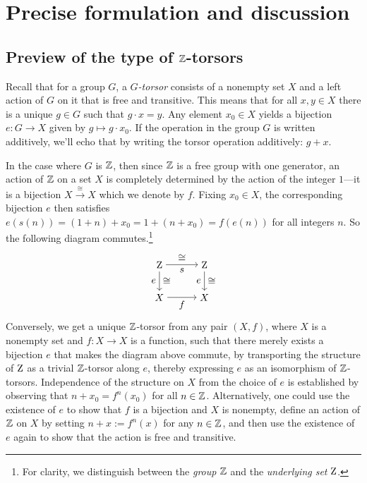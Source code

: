 \documentclass[a4paper,12pt]{amsart}
\begin{document}
\section{Precise formulation and discussion}\label{sec:statement}

\subsection{Preview of the type of $\mathbb{Z}$-torsors}
\label{sec:preview-Z-tors}

Recall that for a group $G$, a \emph{$G$-torsor} consists of a nonempty set $X$ and
a left action of $G$ on it that is free and transitive.
This means that for all $x,y \in X$ there is a unique $g \in G$ such
that $g \cdot x = y$.
Any element $x_0 \in X$ yields a bijection $e: G \to X$ given by $g \mapsto g \cdot x_0$.
If the operation in the group $G$ is written additively, we'll echo that by writing the torsor operation additively: $g + x$.

In the case where $G$ is $\mathbb{Z}$, then since $\mathbb{Z}$ is a free group with one generator, an action of $\mathbb{Z}$ on a set $X$ is completely
determined by the action of the integer $1$---it is a bijection $X \xrightarrow{\cong} X$ which we denote by $f$.
Fixing $x_0\in X$, the corresponding bijection $e$ then satisfies
  $e(s(n)) = (1+n) + x_0 = 1 + (n + x_0) = f(e(n))$ for all
integers $n$.
So the following diagram commutes.\footnote{%
  For clarity, we distinguish between the \emph{group} $\mathbb{Z}$
  and the \emph{underlying set} $\mathrm{Z}$.}
\[
\begin{tikzpicture} %
   \matrix (m)
   [matrix of math nodes, row sep=2em, column sep=3em, ampersand replacement=\&]
    {\zet \& \zet \\ X \& X \\ };
\draw[->] (m-1-1) -- (m-1-2) node[midway,below] {$s$} node[midway,above] {$\cong$};
\draw[->] (m-1-1) -- (m-2-1) node[midway,left] {$e$} node[midway,right] {$\cong$};
\draw[->] (m-1-2) -- (m-2-2) node[midway,left] {$e$} node[midway,right] {$\cong$};
\draw[->] (m-2-1) -- (m-2-2) node[midway,below] {$f$} ;
\end{tikzpicture}
\]
Conversely, we get a unique $\mathbb{Z}$-torsor from any pair $(X,f)$, where $X$ is a nonempty set and $f : X \to X$ is a function, such that there merely
exists a bijection $e$ that makes the diagram above commute, by transporting the structure of $\mathrm{Z}$ as a trivial $\mathbb{Z}$-torsor along $e$, thereby
expressing $e$ as an isomorphism of $\mathbb{Z}$-torsors.  Independence of the structure on $X$ from the choice of $e$ is established by observing that
$n + x_0 = f^n(x_0)$ for all $n \in \mathbb{Z}$.
Alternatively, one could use the existence of $e$ to show that $f$ is a bijection and $X$ is nonempty,
define an action of $\mathbb{Z}$ on $X$ by setting $n + x := f^n(x)$ for any $n \in \mathbb{Z}$, and then use the existence of $e$ again to show that the
action is free and transitive.
\end{document}

